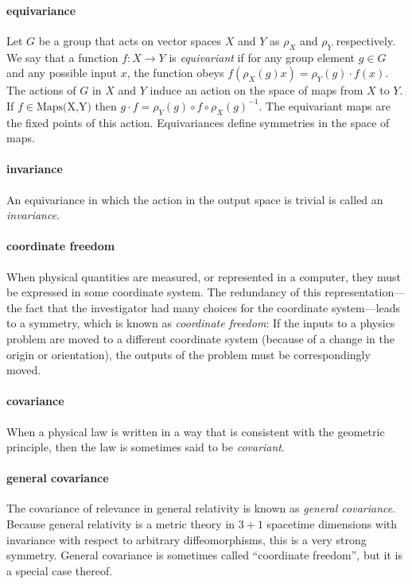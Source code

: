\documentclass{article}
\theoremstyle{plain}
\theoremstyle{definition}
\theoremstyle{remark}
\begin{document}
\paragraph{equivariance}
Let $G$ be a group that acts on vector spaces $X$ and $Y$ as $\rho_X$ and $\rho_Y$ respectively. We say that a function $f:X\to Y$ is \emph{equivariant} if for any group element $g\in G$ and any possible input $x$, the function obeys $f( \rho_X(g) x) = \rho_Y(g)\cdot f(x)$.
The actions of $G$ in $X$ and $Y$ induce an action on the space of maps from $X$ to $Y$. If $f\in \text{Maps(X,Y)}$ then $g\cdot f = \rho_Y(g)\circ f \circ \rho_X(g)^{-1}$.
The equivariant maps are the fixed points of this action.
Equivariances define symmetries in the space of maps. 

\paragraph{invariance}
An equivariance in which the action in the output space is trivial is called an \emph{invariance}.

\paragraph{coordinate freedom}
When physical quantities are measured, or represented in a computer, they must be expressed in some coordinate system.
The redundancy of this representation---the fact that the investigator had many choices for the coordinate system---leads to a symmetry, which is known as \emph{coordinate freedom}:
If the inputs to a physics problem are moved to a different coordinate system (because of a change in the origin or orientation), the outputs of the problem must be correspondingly moved.

\paragraph{covariance}
When a physical law is written in a way that is consistent with the geometric principle, then the law is sometimes said to be \emph{covariant}.

\paragraph{general covariance}
The covariance of relevance in general relativity \cite{einstein} is known as \emph{general covariance}.
Because general relativity is a metric theory in $3+1$ spacetime dimensions with invariance with respect to arbitrary diffeomorphisms, this is a very strong symmetry.
General covariance is sometimes called ``coordinate freedom'', but it is a special case thereof.
\end{document}
